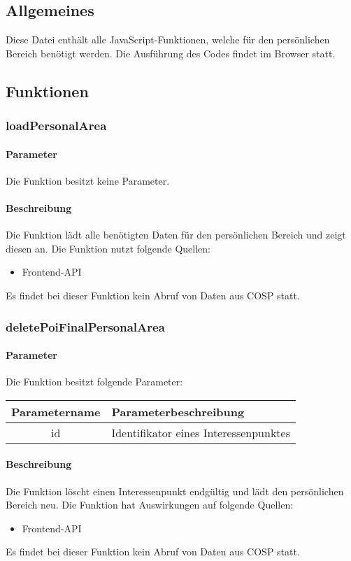 \subsection{Allgemeines} Diese Datei enthält alle JavaScript-Funktionen, welche für den persönlichen Bereich benötigt werden.
Die Ausführung des Codes findet im Browser statt.
\subsection{Funktionen}
\subsubsection{loadPersonalArea}
\paragraph{Parameter} Die Funktion besitzt keine Parameter.
\paragraph{Beschreibung} Die Funktion lädt alle benötigten Daten für den persönlichen Bereich und zeigt diesen an. Die Funktion nutzt folgende Quellen:
\begin{itemize}
	\item Frontend-API
\end{itemize}
Es findet bei dieser Funktion kein Abruf von Daten aus {\glqq COSP\grqq} statt.
\subsubsection{deletePoiFinalPersonalArea}
\paragraph{Parameter} Die Funktion besitzt folgende Parameter:
\begin{table}[H]
	\begin{tabular}{|c|p{11cm}|}
		\hline
		\textbf{Parametername} & \textbf{Parameterbeschreibung} \\ \hline
		id & Identifikator eines Interessenpunktes \\ \hline
	\end{tabular}
\end{table}
\paragraph{Beschreibung} Die Funktion löscht einen Interessenpunkt endgültig und lädt den persönlichen Bereich neu. Die Funktion hat Auswirkungen auf folgende Quellen:
\begin{itemize}
	\item Frontend-API
\end{itemize}
Es findet bei dieser Funktion kein Abruf von Daten aus {\glqq COSP\grqq} statt.
